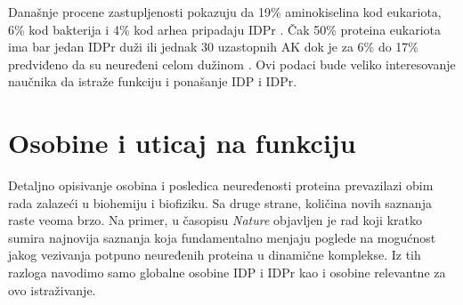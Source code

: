 Današnje procene zastupljenosti pokazuju da 19\% aminokiselina kod
eukariota, 6\% kod bakterija i 4\% kod arhea pripadaju
IDPr \parencite{Peng2014}.  Čak 50\% proteina eukariota ima bar jedan IDPr duži
ili jednak 30 uzastopnih AK \parencite{Xue2012} dok je za 6\% do 17\%
predviđeno da su neuređeni celom dužinom \parencite{Tompa2002}.  Ovi podaci bude
veliko interesovanje naučnika da istraže funkciju i ponašanje IDP i IDPr.

\section {Osobine i uticaj na funkciju}

Detaljno opisivanje osobina i posledica neuređenosti proteina prevazilazi obim
rada zalazeći u biohemiju i biofiziku. Sa druge strane, količina novih saznanja
raste veoma brzo. Na primer, u časopisu \textit{Nature} objavljen je rad
\parencite{rebecca2018} koji kratko sumira najnovija saznanja koja
fundamentalno menjaju poglede na mogućnost jakog vezivanja potpuno neuređenih
proteina u dinamične komplekse.  Iz tih razloga navodimo samo globalne osobine
IDP i IDPr kao i osobine relevantne za ovo istraživanje.

